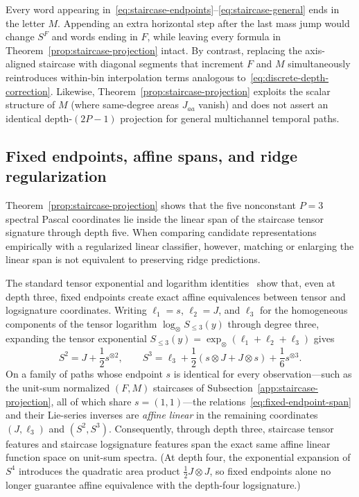 \begin{remark}
Every word appearing in~\eqref{eq:staircase-endpoints}--\eqref{eq:staircase-general}
ends in the letter \(M\). Appending an extra horizontal step after the last mass
jump would change \(S^F\) and words ending in \(F\), while leaving every formula
in Theorem~\ref{prop:staircase-projection} intact. By contrast, replacing the
axis-aligned staircase with diagonal segments that increment \(F\) and \(M\)
simultaneously reintroduces within-bin interpolation terms analogous
to~\eqref{eq:discrete-depth-correction}. Likewise, Theorem~\ref{prop:staircase-projection}
exploits the scalar structure of \(M\) (where same-degree areas \(J_{aa}\) vanish)
and does not assert an identical depth-\((2P-1)\) projection for general
multichannel temporal paths.
\end{remark}

\subsection{Fixed endpoints, affine spans, and ridge regularization}
\label{app:fixed-endpoints}
Theorem~\ref{prop:staircase-projection} shows that the five nonconstant \(P=3\)
spectral Pascal coordinates lie inside the linear span of the staircase tensor
signature through depth five. When comparing candidate representations empirically
with a regularized linear classifier, however, matching or enlarging the linear
span is not equivalent to preserving ridge predictions.

The standard tensor exponential and logarithm identities~\cite{chen} show that,
even at depth three, fixed endpoints create exact affine equivalences between
tensor and logsignature coordinates. Writing \(\ell_1 = s\), \(\ell_2 = J\), and
\(\ell_3\) for the homogeneous components of the tensor logarithm
\(\log_\otimes S_{\leq 3}(y)\) through degree three, expanding the tensor
exponential \(S_{\leq 3}(y) = \exp_\otimes(\ell_1 + \ell_2 + \ell_3)\) gives
\begin{equation}\label{eq:fixed-endpoint-span}
 S^2 = J + \frac{1}{2} s^{\otimes 2}, \qquad
 S^3 = \ell_3 + \frac{1}{2}(s \otimes J + J \otimes s) + \frac{1}{6} s^{\otimes 3}.
\end{equation}
On a family of paths whose endpoint \(s\) is identical for every observation---such
as the unit-sum normalized \((F, M)\) staircases of Subsection~\ref{app:staircase-projection},
all of which share \(s = (1, 1)\)---the relations~\eqref{eq:fixed-endpoint-span}
and their Lie-series inverses are \emph{affine linear} in the remaining
coordinates \((J, \ell_3)\) and \((S^2, S^3)\). Consequently, through depth three,
staircase tensor features and staircase logsignature features span the exact same
affine linear function space on unit-sum spectra. (At depth four, the exponential
expansion of \(S^4\) introduces the quadratic area product \(\tfrac12 J \otimes J\),
so fixed endpoints alone no longer guarantee affine equivalence with the
depth-four logsignature.)

